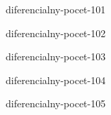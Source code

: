 \begin{defproblem}{diferencialny-pocet-101}

\end{defproblem}

\begin{defproblem}{diferencialny-pocet-102}

\end{defproblem}

\begin{defproblem}{diferencialny-pocet-103}

\end{defproblem}

\begin{defproblem}{diferencialny-pocet-104}

\end{defproblem}

\begin{defproblem}{diferencialny-pocet-105}

\end{defproblem}
